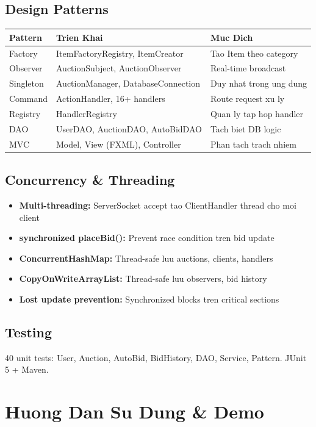 ﻿\documentclass[12pt, a4paper]{report}
\begin{document}
\section{Design Patterns}
\begin{tabular}{|l|l|l|}
\hline
\textbf{Pattern} & \textbf{Trien Khai} & \textbf{Muc Dich} \\
\hline
Factory & ItemFactoryRegistry, ItemCreator & Tao Item theo category \\
Observer & AuctionSubject, AuctionObserver & Real-time broadcast \\
Singleton & AuctionManager, DatabaseConnection & Duy nhat trong ung dung \\
Command & ActionHandler, 16+ handlers & Route request xu ly \\
Registry & HandlerRegistry & Quan ly tap hop handler \\
DAO & UserDAO, AuctionDAO, AutoBidDAO & Tach biet DB logic \\
MVC & Model, View (FXML), Controller & Phan tach trach nhiem \\
\hline
\end{tabular}

\section{Concurrency \& Threading}
\begin{itemize}
    \item \textbf{Multi-threading:} ServerSocket accept tao ClientHandler thread cho moi client
    \item \textbf{synchronized placeBid():} Prevent race condition tren bid update
    \item \textbf{ConcurrentHashMap:} Thread-safe luu auctions, clients, handlers
    \item \textbf{CopyOnWriteArrayList:} Thread-safe luu observers, bid history
    \item \textbf{Lost update prevention:} Synchronized blocks tren critical sections
\end{itemize}

\section{Testing}
40 unit tests: User, Auction, AutoBid, BidHistory, DAO, Service, Pattern. JUnit 5 + Maven.

\newpage

\chapter{Huong Dan Su Dung \& Demo}
\end{document}
